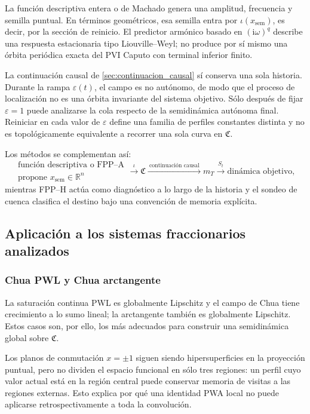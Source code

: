La función descriptiva entera o de Machado genera una amplitud, frecuencia y
semilla puntual. En términos geométricos, esa semilla entra por
\(\iota(x_{\mathrm{sem}})\), es decir, por la sección de reinicio. El predictor
armónico basado en \((\mathrm i\omega)^q\) describe una respuesta estacionaria
tipo Liouville--Weyl; no produce por sí mismo una órbita periódica exacta del
PVI Caputo con terminal inferior finito.

La continuación causal de \cref{sec:continuacion_causal} sí conserva una sola
historia. Durante la rampa \(\varepsilon(t)\), el campo es no autónomo, de modo
que el proceso de localización no es una órbita invariante del sistema objetivo.
Sólo después de fijar \(\varepsilon=1\) puede analizarse la cola respecto de la
semidinámica autónoma final. Reiniciar en cada valor de \(\varepsilon\) define
una familia de perfiles constantes distinta y no es topológicamente equivalente
a recorrer una sola curva en \(\mathfrak C\).

Los métodos se complementan así:
\begin{equation}
 \begin{array}{c}
 \text{función descriptiva o FPP--A}\\[-0.1em]
 \text{propone }x_{\mathrm{sem}}\in\mathbb R^n
 \end{array}
 \xrightarrow{\ \iota\ }
 \mathfrak C
 \xrightarrow{\ \text{continuación causal}\ }
 m_T
 \xrightarrow{\ S_t\ }
 \text{dinámica objetivo},
 \label{eq:geofo-method-chain}
\end{equation}
mientras FPP--H actúa como diagnóstico a lo largo de la historia y el sondeo de
cuenca clasifica el destino bajo una convención de memoria explícita.

\subsection{Aplicación a los sistemas fraccionarios analizados}

\subsubsection{Chua PWL y Chua arctangente}

La saturación continua PWL es globalmente Lipschitz y el campo de Chua tiene
crecimiento a lo sumo lineal; la arctangente también es globalmente Lipschitz.
Estos casos son, por ello, los más adecuados para construir una semidinámica
global sobre \(\mathfrak C\).

Los planos de conmutación \(x=\pm1\) siguen siendo hipersuperficies en la
proyección puntual, pero no dividen el espacio funcional en sólo tres regiones:
un perfil cuyo valor actual está en la región central puede conservar memoria
de visitas a las regiones externas. Esto explica por qué una identidad PWA
local no puede aplicarse retrospectivamente a toda la convolución.

